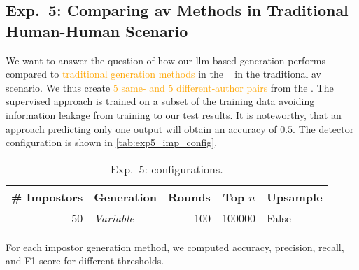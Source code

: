 \subsection{Exp.\ 5: Comparing \acs{av} Methods in Traditional Human-Human Scenario}
\label{subsec:imp_gen}

We want to answer the question of how our \ac{llm}-based \imp{} generation performs compared to \textcolor{orange}{traditional \imp{} generation methods} in the \impAppr{}~\citep{koppel_determining_2014} %
in the traditional \ac{av} scenario.
We thus create \textcolor{orange}{5 same- and 5 different-author pairs} from the \dataStudent{}. %
The supervised approach is trained on a subset of the training data avoiding information leakage from training to our test results.
It is noteworthy, that an approach predicting only one output will obtain an accuracy of $0.5$.
The \impAppr{} 
detector configuration is shown in \autoref{tab:exp5_imp_config}. %

\begin{table}[h]
\centering\small
\caption{Exp.\ 5: \impAppr{} configurations.}
\label{tab:exp5_imp_config}
\begin{tabular}{@{}rlrrl@{}}   %
\toprule
\# Impostors & Generation & Rounds & Top $n$ & Upsample \\
\midrule
50 & \textit{Variable} & 100 & \num{100000} & False \\
\bottomrule
\end{tabular}%
\end{table}


For each impostor generation method, we computed accuracy, precision, recall, and F1 score for different thresholds. 
